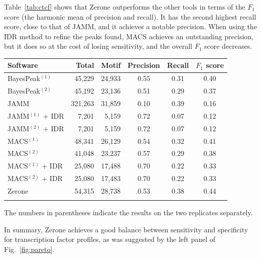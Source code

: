 \documentclass{bioinfo}
\begin{document}
Table~\ref{tab:ctcf} shows that Zerone outperforms the other tools
in terms of the $F_1$ score (the harmonic mean of precision and
recall). It has the second highest recall score, close to that of JAMM,
and it achieves a notable precision.
When using the IDR method to refine the peaks found, MACS achieves an
outstanding precision, but it does so at the cost of losing sensitivity,
and the overall $F_1$ score decreases.

\begin{table}[!b]
{\begin{tabular}{lrrccc}
        \toprule
        \textbf{Software}  & \textbf{Total}  & \textbf{Motif} &
        \textbf{Precision} & \textbf{Recall} & \textbf{$F_{1}$ score} \\
        \midrule
        BayesPeak$^{(1)}$  &  45,229 & 24,933 & 0.55 & 0.31 & 0.40 \\
        BayesPeak$^{(2)}$  &  45,192 & 23,136 & 0.51 & 0.29 & 0.37 \\
        JAMM               & 321,263 & 31,859 & 0.10 & 0.39 & 0.16 \\
        JAMM$^{(1)}$ + IDR &   7,201 &  5,159 & 0.72 & 0.07 & 0.12 \\
        JAMM$^{(2)}$ + IDR &   7,201 &  5,159 & 0.72 & 0.07 & 0.12 \\
        MACS$^{(1)}$       &  48,341 & 26,129 & 0.54 & 0.32 & 0.41 \\
        MACS$^{(2)}$       &  41,048 & 23,237 & 0.57 & 0.29 & 0.38 \\
        MACS$^{(1)}$ + IDR &  25,080 & 17,488 & 0.70 & 0.22 & 0.33 \\
        MACS$^{(2)}$ + IDR &  25,080 & 17,483 & 0.70 & 0.22 & 0.33 \\
        Zerone             &  54,315 & 28,738 & 0.53 & 0.38 & 0.44 \\
        \botrule
\end{tabular}}{The numbers in parentheses indicate the results on the two
replicates separately.}
\end{table}

In summary, Zerone achieves a good balance between sensitivity and
specificity for transcription factor profiles, as was suggested by
the left panel of Fig.~\ref{fig:pareto}.
\end{document}
